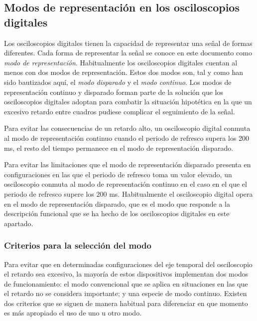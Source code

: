 \subsection{Modos de representación en los osciloscopios digitales}\label{subsec:repmodes}

Los osciloscopios digitales tienen la capacidad de representar una señal de
formas diferentes. Cada forma de representar la señal se conoce en este
documento como \emph{modo de representación}. Habitualmente los
osciloscopios digitales cuentan al menos con dos modos de representación.
Estos dos modos son, tal y como han sido bautizados aquí, el \emph{modo
disparado} y el \emph{modo continuo}. Los modos de representación continuo
y disparado forman parte de la solución que los osciloscopios digitales
adoptan para combatir la situación hipotética en la que un excesivo retardo
entre cuadros pudiese complicar el seguimiento de la señal.

Para evitar las consecuencias de un retardo alto, un osciloscopio digital
conmuta al modo de representación continuo cuando el periodo de refresco
supera los 200 ms, el resto del tiempo permanece en el modo de
representación disparado. %

Para evitar las limitaciones que el modo de representación disparado
presenta en configuraciones en las que el periodo de refresco toma un valor
elevado, un osciloscopio conmuta al modo de representación continuo en el
caso en el que el periodo de refresco supere los 200 ms. Habitualmente el
osciloscopio digital opera en el modo de representación disparado, que es
el modo que responde a la descripción funcional que se ha hecho de los
osciloscopios digitales en este apartado.


\subsubsection{Criterios para la selección del modo}

Para evitar que en determinadas configuraciones del eje temporal del
osciloscopio el retardo sea excesivo, la mayoría de estos dispositivos
implementan dos modos de funcionamiento: el modo convencional que se aplica
en situaciones en las que el retardo no se considera importante; y una
especie de modo continuo. Existen dos criterios que se siguen de manera
habitual para diferenciar en que momento es más apropiado el uso de uno u
otro modo.



